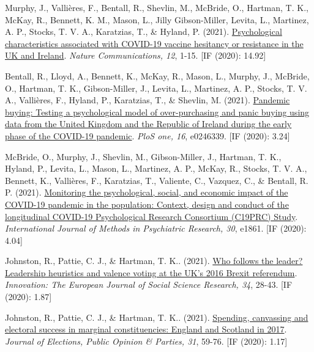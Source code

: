 \documentclass[12pt]{article}
\begin{document}
\begin{bibenum}
	\item Murphy, J., Vallières, F., Bentall, R., Shevlin, M.,  McBride, O., 
	Hartman, T. K., McKay, R., Bennett, K. M., Mason, L., Jilly Gibson-Miller,  
	Levita, L., Martinez, A. P., Stocks, T. V. A.,  Karatzias, T., \& Hyland, P. (2021).
		\href{https://doi.org/10.1038/s41467-020-20226-9}{Psychological characteristics 
		associated with COVID-19 vaccine hesitancy or resistance in the UK and Ireland}. 
		\emph{Nature Communications, 12}, 1-15. [IF (2020): 14.92]

	\item Bentall, R., Lloyd, A., Bennett, K., McKay, R., Mason, L., Murphy, J., 
	McBride, O., Hartman, T. K., Gibson-Miller, J., Levita, L., Martinez, A. P., 
	Stocks, T. V. A., Vallières, F., Hyland, P., Karatzias, T., \& Shevlin, M. (2021). 
		\href{https://doi.org/10.1371/journal.pone.0246339}{Pandemic buying: 
		Testing a psychological model of over-purchasing and panic buying 
		using data from the United Kingdom and the Republic of Ireland 
		during the early phase of the COVID-19 pandemic}.
		\emph{PloS one, 16}, e0246339. [IF (2020): 3.24]
	
	\item McBride, O., Murphy, J., Shevlin, M., Gibson-Miller, J., Hartman, T. K., 
	Hyland, P., Levita, L., Mason, L., Martinez, A. P., McKay, R., Stocks, T. V. A., 
	Bennett, K., Vallières, F., Karatzias, T., Valiente, C., Vazquez, C., \& Bentall, R. P. (2021). 
		\href{https://doi.org/10.1002/mpr.1861}{Monitoring the psychological, 
		social, and economic impact of the COVID-19 pandemic in the population: 
		Context, design and conduct of the longitudinal COVID-19 Psychological 
		Research Consortium (C19PRC) Study}.
		\emph{International Journal of Methods in Psychiatric Research, 30}, e1861. [IF (2020): 4.04]
	
	\item Johnston, R., Pattie, C. J., \& {Hartman, T. K.}. (2021). 
		\href{https://doi.org/10.1080/13511610.2020.1746905}
		{Who follows the leader? Leadership heuristics and valence voting 
		at the UK’s 2016 Brexit referendum}.
		\emph{Innovation: The European Journal of Social Science Research, 34}, 
		28-43. [IF (2020): 1.87]

	\item Johnston, R., Pattie, C. J., \& {Hartman, T. K.}. (2021). 
		\href{https://10.1080/17457289.2019.1582534}
		{Spending, canvassing and electoral success in marginal constituencies: 
		England and Scotland in 2017}. 
		\emph{Journal of Elections, Public Opinion \& Parties, 31}, 59-76. [IF (2020): 1.17]
		

\end{bibenum}
\end{document}

